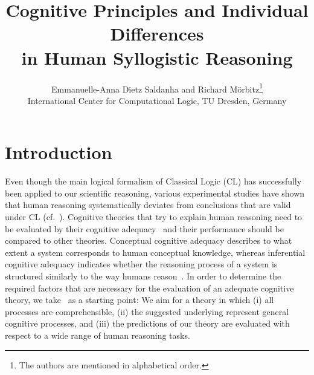 \documentclass[12pt]{article}
\title{Cognitive Principles and Individual Differences \\ in Human Syllogistic Reasoning}
\author{
Emmanuelle-Anna Dietz Saldanha and Richard M{\"o}rbitz\thanks{The authors are mentioned in alphabetical order.} \\
\normalsize International Center for Computational Logic, TU
  Dresden, Germany
}
\date{}
\begin{document}
\maketitle

\section{Introduction}
% 
% 

Even though the main logical formalism of Classical Logic (CL) has successfully been applied to our scientific reasoning,
various experimental studies have shown that human reasoning systematically deviates 
from conclusions that are valid under CL (cf.~\cite{wason:68,byrne:89}).
Cognitive theories that try to explain human reasoning need to be evaluated by their cognitive adequacy~\cite{strube:1992} and their performance should be compared to other theories.
Conceptual cognitive adequacy describes to what extent a system corresponds to human conceptual knowledge, whereas inferential cognitive adequacy indicates whether the reasoning process of a system is structured similarly to the way humans reason~\cite{knauff:rauh:renz:1997}. 
In order to determine the required factors that are necessary for the evaluation of an adequate cognitive theory, we take~\cite{ragni:stolzenburg:2015} as a starting point:
We aim for a theory in which (i) all processes are comprehensible, (ii) the suggested underlying represent general cognitive processes, and (iii) the predictions of our theory are evaluated with respect to a wide range of human reasoning tasks. 
\end{document}
